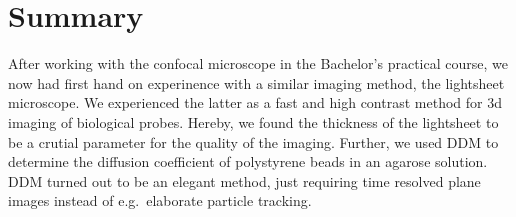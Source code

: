 
\chapter{Summary}\label{chap:fazit}
After working with the confocal microscope in the Bachelor's practical course, we now had first hand on experinence with a similar imaging method, the lightsheet microscope. We experienced the latter as a fast and high contrast method for 3d imaging of biological probes. Hereby, we found the thickness of the lightsheet to be a crutial parameter for the quality of the imaging. Further, we used DDM to determine the diffusion coefficient of polystyrene beads in an agarose solution. DDM turned out to be an elegant method, just requiring time resolved plane images instead of e.g.~elaborate particle tracking. 

